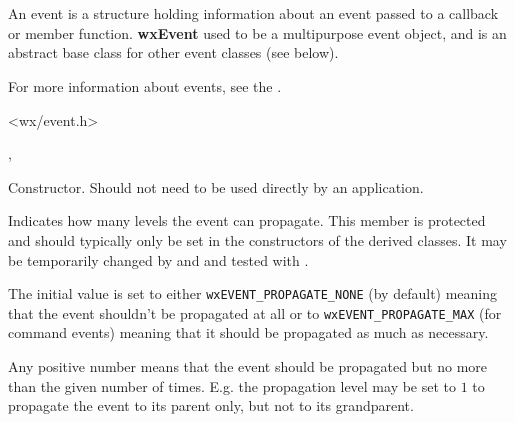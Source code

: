 \section{}\label{wxevent}

An event is a structure holding information about an event passed to a
callback or member function. {\bf wxEvent} used to be a multipurpose
event object, and is an abstract base class for other event classes (see below).

For more information about events, see the .





<wx/event.h>


,\rtfsp
{}


\label{wxeventctor}


Constructor. Should not need to be used directly by an application.

\label{wxeventmpropagationlevel}


Indicates how many levels the event can propagate. This member is protected and
should typically only be set in the constructors of the derived classes. It
may be temporarily changed by  
and  and tested with 
.

The initial value is set to either {\tt wxEVENT\_PROPAGATE\_NONE} (by
default) meaning that the event shouldn't be propagated at all or to 
{\tt wxEVENT\_PROPAGATE\_MAX} (for command events) meaning that it should be
propagated as much as necessary.

Any positive number means that the event should be propagated but no more than
the given number of times. E.g. the propagation level may be set to $1$ to
propagate the event to its parent only, but not to its grandparent.

